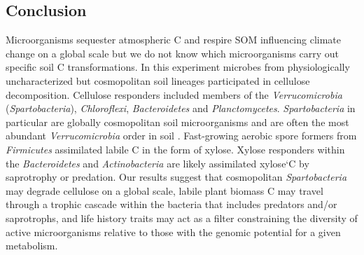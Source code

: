 \subsection{Conclusion} 
Microorganisms sequester atmospheric C and respire SOM influencing climate
change on a global scale but we do not know which microorganisms carry out
specific soil C transformations. In this experiment microbes from
physiologically uncharacterized but cosmopolitan soil lineages participated in
cellulose decomposition. Cellulose responders included members of the
\textit{Verrucomicrobia} (\textit{Spartobacteria}), \textit{Chloroflexi},
\textit{Bacteroidetes} and \textit{Planctomycetes}. \textit{Spartobacteria} in
particular are globally cosmopolitan soil microorganisms and are often the most
abundant \textit{Verrucomicrobia} order in soil \citep{Bergmann_2011}.
Fast-growing aerobic spore formers from \textit{Firmicutes} assimilated labile
C in the form of xylose. Xylose responders within the \textit{Bacteroidetes}
and \textit{Actinobacteria} are likely assimilated xylose`C  by saprotrophy or
predation. Our results suggest that cosmopolitan \textit{Spartobacteria} may
degrade cellulose on a global scale, labile plant biomass C may travel through
a trophic cascade within the bacteria that includes predators and/or
saprotrophs, and life history traits may act as a filter constraining the
diversity of active microorganisms relative to those with the genomic potential
for a given metabolism.
